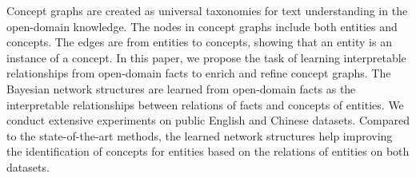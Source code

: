 Concept graphs are created as universal taxonomies for text understanding in the open-domain knowledge. The nodes in concept graphs include both entities and concepts. The edges are from entities to concepts, showing that an entity is an instance of a concept. In this paper, we propose the task of learning interpretable relationships from open-domain facts to enrich and refine concept graphs. The Bayesian network structures are learned from open-domain facts as the interpretable relationships between relations of facts and concepts of entities. We conduct extensive experiments on public English and Chinese datasets. Compared to the state-of-the-art methods, the learned network structures help improving the identification of concepts for entities based on the relations of entities on both datasets.
